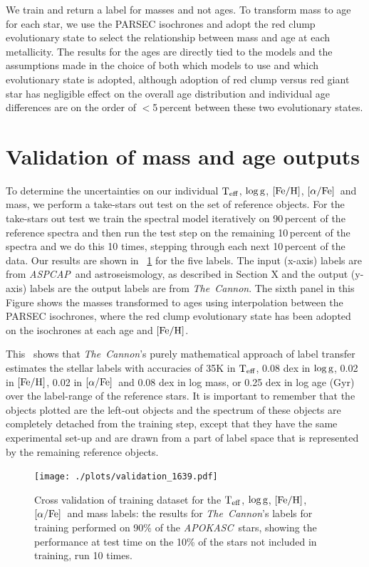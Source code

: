 \documentclass[12pt, preprint]{aastex}
\newcommand{\project}[1]{\textsl{#1}}
\newcommand{\tc}{\project{The~Cannon}}
\newcommand{\apokasc}{\project{APOKASC}}
\newcommand{\aspcap}{\project{ASPCAP}}
\newcommand{\teff}{\mbox{$\rm T_{eff}$}}
\newcommand{\feh}{\mbox{$\rm [Fe/H]$}}
\newcommand{\alphafe}{\mbox{$\rm [\alpha/Fe]$}}
\newcommand{\logg}{\mbox{$\rm \log g$}}
\begin{document}
We train and return a label for masses and not ages. To transform mass to age for each star, we use the PARSEC isochrones and adopt the red clump evolutionary state to select the relationship between mass and age at each metallicity.  The results for the ages are directly tied to the models and the assumptions made in the choice of both which models to use and which evolutionary state is adopted, although adoption of red clump versus red giant star has negligible effect on the overall age distribution and individual age differences are on the order of $<$5\,percent between these two evolutionary states. 

\section{Validation of mass and age outputs}

To determine the uncertainties on our individual \teff, \logg, \feh, \alphafe\ and mass, we perform a take-stars out test on the set of reference objects.
For the take-stars out test we train the spectral model iteratively on 90\,percent of the reference spectra and then run the test step on the remaining 10\,percent of the spectra and we do this 10 times, stepping through each next 10\,percent of the data. Our results are shown in \figurename~\ref{fig:validation1} for the five labels. The input (x-axis) labels are from \aspcap\ and astroseismology, as described in Section X and the output (y-axis) labels are the output labels are from \tc.  The sixth panel in this Figure shows the masses transformed to ages using interpolation between the PARSEC isochrones, where the red clump evolutionary state has been adopted on the isochrones at each age and \feh. 

This \figurename\ shows that \tc 's purely mathematical approach of label transfer estimates the stellar labels with accuracies of 35K in \teff, 0.08 dex in \logg, 0.02 in \feh, 0.02 in \alphafe\ and  0.08 dex in log mass, or 0.25 dex in log age (Gyr) over the label-range of the reference stars. It is important to remember that the objects plotted are the left-out objects and the spectrum of these objects are completely detached from the training step,  except that they have the same experimental set-up and are drawn from a part of label space that is represented by the remaining reference objects.

\begin{figure}[p!]
\centering
        \texttt{[image: ./plots/validation\_1639.pdf]}
  \caption{Cross validation of training dataset for the \teff, \logg, \feh, \alphafe\ and mass labels: the results for \tc's labels for training performed on 90\% of the \apokasc\ stars, showing the performance at test time on the 10\% of the stars not included in training, run 10 times.}
\label{fig:validation1}
\end{figure}
\end{document}
